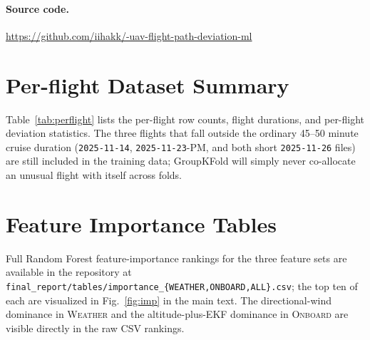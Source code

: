 \documentclass[sigconf, nonacm]{acmart}
\begin{document}
\paragraph{Source code.}
\url{https://github.com/iihakk/-uav-flight-path-deviation-ml}




\appendix
\section{Per-flight Dataset Summary}

Table~\ref{tab:perflight} lists the per-flight row counts, flight
durations, and per-flight deviation statistics.  The three flights that
fall outside the ordinary 45--50 minute cruise duration
(\texttt{2025-11-14}, \texttt{2025-11-23}-\textsf{PM}, and both short
\texttt{2025-11-26} files) are still included in the training data;
GroupKFold will simply never co-allocate an unusual flight with itself
across folds.

\begin{table}[h]
\centering
\caption{Per-flight summary of the 15 BIN-logged flights.  Columns: number of 1-Hz samples after downsampling, flight duration in minutes, per-flight mean and maximum cross-track deviation in metres.}
\label{tab:perflight}
\small

\end{table}

\section{Feature Importance Tables}

Full Random Forest feature-importance rankings for the three feature
sets are available in the repository at
\texttt{final\_report/tables/importance\_\{WEATHER,ONBOARD,ALL\}.csv};
the top ten of each are visualized in Fig.~\ref{fig:imp} in the main
text.  The directional-wind dominance in \textsc{Weather} and the
altitude-plus-EKF dominance in \textsc{Onboard} are visible directly in
the raw CSV rankings.
\end{document}
